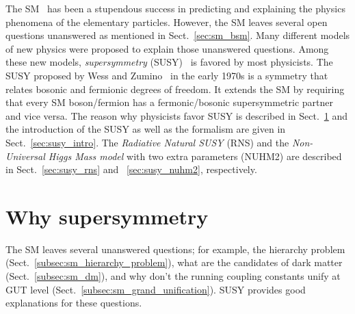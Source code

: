 The SM~\cite{Salam:1968rm, Glashow:1961tr, Weinberg:1967tq, Herrero:1998eq, Cottingham:2007zz} has been a stupendous success in predicting and explaining the physics phenomena of the elementary particles.
However, the SM leaves several open questions unanswered as mentioned in Sect.~\ref{sec:sm_bsm}.
Many different models of new physics were proposed to explain those unanswered questions.
Among these new models, \textit{supersymmetry} (SUSY)~\cite{Wess:1974tw, Lykken:1996xt, Drees:1996ca, Martin:1997ns, Bilal:2001nv, Argyres:2001eva, Peskin:2008nw, Aitchison:2005cf, Shadmi:2017qdk} is favored by most physicists.
The SUSY proposed by Wess and Zumino~\cite{Wess:1974tw} in the early 1970s is a symmetry that relates bosonic and fermionic degrees of freedom.
It extends the SM by requiring that every SM boson/fermion has a fermonic/bosonic supersymmetric partner and vice versa.
The reason why physicists favor SUSY is described in Sect.~\ref{sec:susy_why_susy} and the introduction of the SUSY as well as the formalism are given in Sect.~\ref{sec:susy_intro}.
The \textit{Radiative Natural SUSY} (RNS) and the \textit{Non-Universal Higgs Mass model} with two extra parameters (NUHM2) are described in Sect.~\ref{sec:susy_rns} and ~\ref{sec:susy_nuhm2}, respectively.


\section{Why supersymmetry}
\label{sec:susy_why_susy}
The SM leaves several unanswered questions; for example, the hierarchy problem (Sect.~\ref{subsec:sm_hierarchy_problem}), what are the candidates of dark matter (Sect.~\ref{subsec:sm_dm}), and why don't the running coupling constants unify at GUT level (Sect.~\ref{subsec:sm_grand_unification}).
SUSY provides good explanations for these questions.


